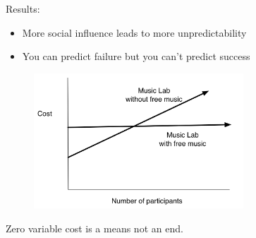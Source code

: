 \documentclass[aspectratio=169]{beamer}
\def\vf{\vfill}
\begin{document}
\begin{frame}

\setcounter{subfigure}{0}
\begin{figure}
  \centering
  \hspace{0in}
\end{figure}

\end{frame}
\begin{frame}

Results:
\begin{itemize}
\item More social influence leads to more unpredictability
\pause
\item You can predict failure but you can't predict success
\end{itemize}
 
\end{frame}
\begin{frame}

\begin{figure}
  \centering
  \includegraphics[width=0.7\textwidth]{figures/zero_variable_cost_experiments_musiclab}
\end{figure}

\vf
\pause
\Large{Zero variable cost is a means not an end.}

\end{frame}
\end{document}
